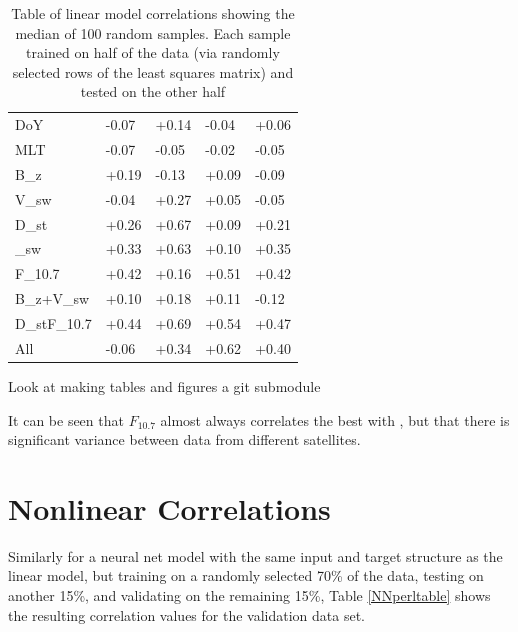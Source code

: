 \begin{table}[h]
	\footnotesize
	\begin{tabular}{|L|LLLL|}
		\hline
		&  &  &  & \\ \hline
		DoY & -0.07 & +0.14 & -0.04 & +0.06 \\
		MLT & -0.07 & -0.05 & -0.02 & -0.05 \\
		B_z & +0.19 & -0.13 & +0.09 & -0.09 \\
		V_{sw} & -0.04 & +0.27 & +0.05 & -0.05 \\
		D_{st} & +0.26 & +0.67 & +0.09 & +0.21 \\
		\rho_{sw} & +0.33 & +0.63 & +0.10 & +0.35 \\
		F_{10.7} & +0.42 & +0.16 & +0.51 & +0.42 \\
		B_z+V_{sw} & +0.10 & +0.18 & +0.11 & -0.12 \\
		D_{st}\text{+}F_{10.7} & +0.44 & +0.69 & +0.54 & +0.47 \\
		All & -0.06 & +0.34 & +0.62 & +0.40 \\
		\hline
	\end{tabular}
	\caption{Table of linear model correlations showing the median of 100 random samples. Each sample trained on half of the data (via randomly selected rows of the least squares matrix) and tested on the other half} 
	\label{CCperltable}
\end{table}



\vnote Look at making tables and figures a git submodule

It can be seen that $F_{10.7}$ almost always correlates the best with \req, but that there is significant variance between data from different satellites. 

\section{Nonlinear Correlations}

Similarly for a neural net model with the same input and target structure as the linear model, but training on a randomly selected 70\% of the data, testing on another 15\%, and validating on the remaining 15\%, Table \ref{NNperltable} shows the resulting correlation values for the validation data set.

